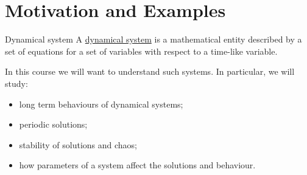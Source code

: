 \documentclass[../Main.tex]{subfiles}
\begin{document}
\section{Motivation and Examples}
\begin{definition}{Dynamical system}
    A \underline{dynamical system} is a mathematical entity described by a set of equations for a set of variables with respect to a time-like variable.
\end{definition}
In this course we will want to understand such systems. In particular, we will study:
\begin{itemize}
    \item long term behaviours of dynamical systems;
    \item periodic solutions;
    \item stability of solutions and chaos;
    \item how parameters of a system affect the solutions and behaviour.
\end{itemize}
\end{document}
